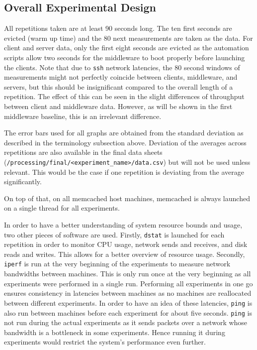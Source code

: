 \documentclass[11pt,a4paper]{article}
\begin{document}
\subsection{Overall Experimental Design}
All repetitions taken are at least 90 seconds long. The ten first seconds are evicted (warm up time) and the 80 next measurements are taken as the data. For client and server data, only the first eight seconds are evicted as the automation scripts allow two seconds for the middleware to boot properly before launching the clients. Note that due to \texttt{ssh} network latencies, the 80 second windows of measurements might not perfectly coincide between clients, middleware, and servers, but this should be insignificant compared to the overall length of a repetition. The effect of this can be seen in the slight differences of throughput between client and middleware data. However, as will be shown in the first middleware baseline, this is an irrelevant difference.

The error bars used for all graphs are obtained from the standard deviation as described in the terminology subsection above. Deviation of the averages across repetitions are also available in the final data sheets (\texttt{/processing/final/<experiment_name>/data.csv}) but will not be used unless relevant. This would be the case if one repetition is deviating from the average significantly.

On top of that, on all memcached host machines, memcached is always launched on a single thread for all experiments.

In order to have a better understanding of system resource bounds and usage, two other pieces of software are used. Firstly, \texttt{dstat} is launched for each repetition in order to monitor CPU usage, network sends and receives, and disk reads and writes. This allows for a better overview of resource usage. Secondly, \texttt{iperf} is run at the very beginning of the experiments to measure network bandwidths between machines. This is only run once at the very beginning as all experiments were performed in a single run. Performing all experiments in one go ensures consistency in latencies between machines as no machines are reallocated between different experiments. In order to have an idea of these latencies, \texttt{ping} is also run between machines before each experiment for about five seconds. \texttt{ping} is not run during the actual experiments as it sends packets over a network whose bandwidth is a bottleneck in some experiments. Hence running it during experiments would restrict the system's performance even further.
\end{document}
